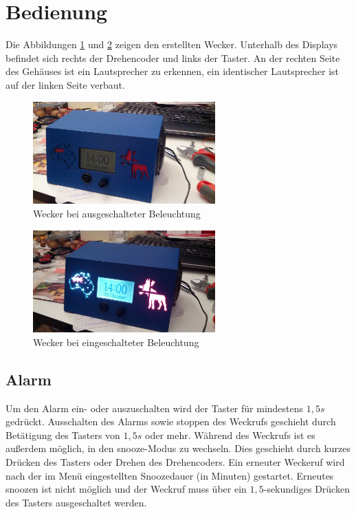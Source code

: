 \documentclass[journal, a4paper]{IEEEtran}
\begin{document}

\section{Bedienung}
Die Abbildungen \ref{fig:wecker1} und \ref{fig:wecker2} zeigen den erstellten Wecker. Unterhalb des Displays befindet sich rechts der Drehencoder und links der Taster. An der rechten Seite des Gehäuses ist ein Lautsprecher zu erkennen, ein identischer Lautsprecher ist auf der linken Seite verbaut.

\begin{figure}
	\begin{center}	
		\includegraphics[width=7cm]{./Grafiken/wecker1.jpeg}
		\caption{Wecker bei ausgeschalteter Beleuchtung}
		\label{fig:wecker1}
	\end{center}
\end{figure}
\begin{figure}
	\begin{center}	
		\includegraphics[width=7cm]{./Grafiken/wecker2.jpeg}
		\caption{Wecker bei eingeschalteter Beleuchtung}
		\label{fig:wecker2}
	\end{center}
\end{figure}

\subsection{Alarm}
Um den Alarm ein- oder auszuschalten wird der Taster für mindestens $1,5s$ gedrückt. Ausschalten des Alarms sowie stoppen des Weckrufs geschieht durch Betätigung des Tasters von $1,5s$ oder mehr. Während des Weckrufs ist es außerdem möglich, in den snooze-Modus zu wechseln. Dies geschieht durch kurzes Drücken des Tasters oder Drehen des Drehencoders. Ein erneuter Weckeruf wird nach der im Menü eingestellten Snoozedauer (in Minuten) gestartet. Erneutes snoozen ist nicht möglich und der Weckruf muss über ein $1,5$-sekundiges Drücken des Tasters ausgeschaltet werden.
\end{document}
